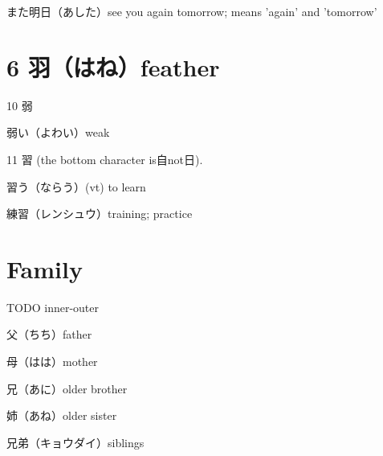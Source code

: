 また明日（あした）see you again tomorrow; means 'again' and 'tomorrow'

\section{6 羽（はね）feather}

10 弱

弱い（よわい）weak

11 習 (the bottom character is自not日).

習う（ならう）(vt) to learn

練習（レンシュウ）training; practice

\section{Family}

TODO inner-outer

父（ちち）father

母（はは）mother

兄（あに）older brother

姉（あね）older sister

兄弟（キョウダイ）siblings

